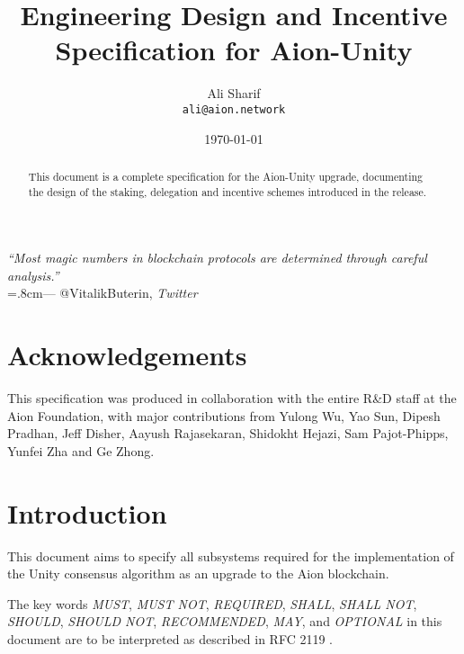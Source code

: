\documentclass{article}
\title{Engineering Design and Incentive\\Specification for Aion-Unity}
\author{
    Ali Sharif\\
    \texttt{ali@aion.network}
}
\date{\today}
\begin{document}
\maketitle

\begin{flushright}
\rightskip=1.8cm\textit{``Most magic numbers in blockchain protocols are determined through careful analysis.''} \\
\vspace{.2em}
\rightskip=.8cm--- @VitalikButerin, \textit{Twitter}
\end{flushright}
\vspace{1em}

\begin{abstract}
This document is a complete specification for the Aion-Unity upgrade, documenting the design of the staking, delegation and incentive schemes introduced in the release. 
\end{abstract}

\section*{Acknowledgements}
This specification was produced in collaboration with the entire R\&D staff at the Aion Foundation, with major contributions from Yulong Wu, Yao Sun, Dipesh Pradhan, Jeff Disher, Aayush Rajasekaran, Shidokht Hejazi, Sam Pajot-Phipps, Yunfei Zha and Ge Zhong. 

\newpage
\tableofcontents
\newpage

\section{Introduction}
This document aims to specify all subsystems required for the implementation of the Unity consensus algorithm \cite{WZS19} as an upgrade to the Aion blockchain.

The key words \textit{MUST}, \textit{MUST NOT}, \textit{REQUIRED}, \textit{SHALL}, \textit{SHALL NOT}, \textit{SHOULD}, \textit{SHOULD NOT}, \textit{RECOMMENDED}, \textit{MAY}, and \textit{OPTIONAL} in this document are to be interpreted as described in RFC 2119 \cite{RFC2119}.



\pagebreak



\clearpage
\begin{appendices}


\end{appendices}
\end{document}
